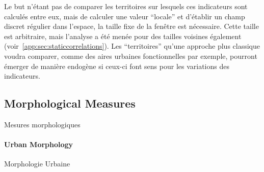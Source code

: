 Le but n'étant pas de comparer les territoires sur lesquels ces indicateurs sont calculés entre eux, mais de calculer une valeur ``locale'' et d'établir un champ discret régulier dans l'espace, la taille fixe de la fenêtre est nécessaire. Cette taille est arbitraire, mais l'analyse a été menée pour des tailles voisines également (voir~\ref{app:sec:staticcorrelations}). Les ``territoires'' qu'une approche plus classique voudra comparer, comme des aires urbaines fonctionnelles par exemple, pourront émerger de manière endogène si ceux-ci font sens pour les variations des indicateurs.





\subsection{Morphological Measures}{Mesures morphologiques}

\paragraph{Urban Morphology}{Morphologie Urbaine}


